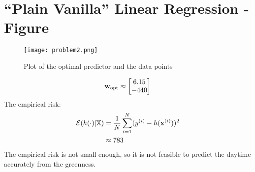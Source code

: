 \documentclass[article,11pt]{article}
\begin{document}
\newpage
\section{``Plain Vanilla'' Linear Regression - Figure}
\label{problem_1}
\begin{figure}[H]
	\centering
	\captionsetup{justification=centering}
	\texttt{[image: problem2.png]}
	\caption{Plot of the optimal predictor and the data points}
\end{figure}
\begin{equation}
	{\bf w}_{\rm opt} \approx \left[\begin{matrix}
	6.15 \\
	-440 \\
	\end{matrix} 
	 \right] 
\end{equation}
The empirical risk:
\begin{equation}
\begin{aligned}
\mathcal{E}(h(\cdot) | \mathbb{X}) & = \frac{1}{N}\sum^{N}_{i=1}(y^{(i)} - h({\bf x}^{(i)}))^2 \\
	& \approx 783
\end{aligned}
\end{equation}
The empirical risk is not small enough, so it is not feasible to predict the daytime accurately from the greenness.
\newpage


\newpage
\end{document}

